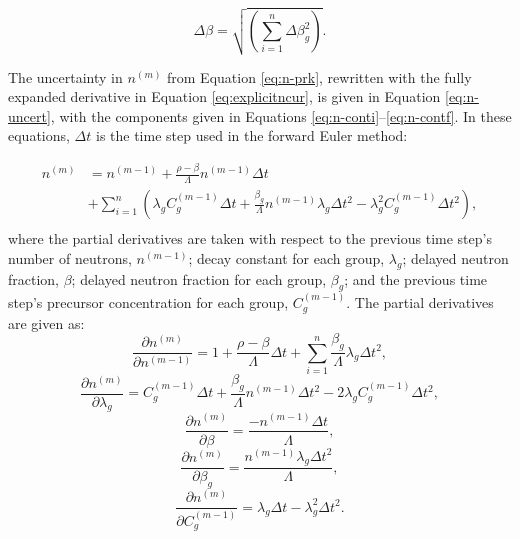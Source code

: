 \documentclass{style/nseJournal}
\begin{document}
\begin{equation}
\Delta \beta = \sqrt{ \left(\sum_{i=1}^{n} \Delta \beta_g^2 \right)}
\label{eq:beta}.
\end{equation}

The uncertainty in $n^{(m)}$ from Equation \eqref{eq:n-prk}, rewritten with the fully expanded derivative in Equation \eqref{eq:explicitncur}, is given in Equation \eqref{eq:n-uncert}, with the components given in Equations \eqref{eq:n-conti}--\eqref{eq:n-contf}. In these equations, $\Delta t$ is the time step used in the forward Euler method:

\begin{equation}
\begin{split}
n^{(m)} & =  n^{(m-1)} + \frac{\rho - \beta}{\Lambda} n^{(m-1)} \Delta t \\
& + \sum_{i=1}^n \left( \lambda_g C_g^{(m-1)} \Delta t + \frac{\beta_g}{\Lambda} n^{(m-1)} \lambda_g \Delta t^2- \lambda_g^2 C_g^{(m-1)} \Delta t^2 \right),\\
\label{eq:explicitncur}
\end{split}
\end{equation}
where the partial derivatives are taken with respect to the previous time step's number of neutrons, $n^{(m-1)}$; decay constant for each group, $\lambda_g$; delayed neutron fraction, $\beta$; delayed neutron fraction for each group, $\beta_g$; and the previous time step's precursor concentration for each group, $C_g^{(m-1)}$.
The partial derivatives are given as:
\begin{equation}
\frac{\partial n^{(m)}}{\partial n^{(m-1)}} = 1 + \frac{\rho - \beta}{\Lambda} \Delta t + \sum_{i=1}^{n} \frac{\beta_g}{\Lambda} \lambda_g \Delta t^2
\label{eq:n-conti},
\end{equation}
\begin{equation}
\frac{\partial n^{(m)}}{\partial \lambda_g} = C_g^{(m-1)} \Delta t + \frac{\beta_g}{\Lambda} n^{(m-1)} \Delta t^2 - 2 \lambda_g C_g^{(m-1)} \Delta t^2,
\end{equation}
\begin{equation}
\frac{\partial n^{(m)}}{\partial \beta} = \frac{-n^{(m-1)} \Delta t}{\Lambda},
\end{equation}
\begin{equation}
\frac{\partial n^{(m)}}{\partial \beta_g} = \frac{n^{(m-1)} \lambda_g \Delta t^2}{\Lambda},
\end{equation}
\begin{equation}
\frac{\partial n^{(m)}}{\partial C_g^{(m-1)}} = \lambda_g \Delta t - \lambda_g^2 \Delta t^2
\label{eq:n-contf}.
\end{equation}
\end{document}
